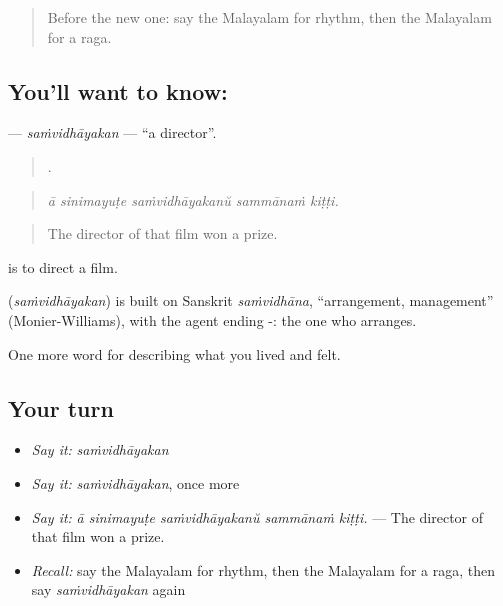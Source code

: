 \label{lesson:ML-C562-samvidhayakan}



\begin{quote}
Before the new one: say the Malayalam for rhythm, then the Malayalam for a raga.
\end{quote}

\subsection*{You'll want to know: }
\textbf{} — \emph{saṁvidhāyakan} — \textquotedblleft{}a director\textquotedblright{}.

\begin{quote}
    .
\end{quote}

\begin{quote}
\emph{ā sinimayuṭe saṁvidhāyakanŭ sammānaṁ kiṭṭi.}
\end{quote}

\begin{quote}
The director of that film won a prize.
\end{quote}

  is to direct a film.

\begin{cousinweb}
\textbf{} (\emph{saṁvidhāyakan}) is built on Sanskrit \emph{saṁvidhāna}, \textquotedblleft{}arrangement, management\textquotedblright{} (Monier-Williams), with the agent ending -: the one who arranges.
\end{cousinweb}

\begin{grammarlens}[title={What you've built}]
One more word for describing what you lived and felt.
\end{grammarlens}

\subsection*{Your turn}
\begin{itemize}
\raggedright
  \item \emph{Say it:} \emph{saṁvidhāyakan}
  \item \emph{Say it:} \emph{saṁvidhāyakan}, once more
  \item \emph{Say it:} \emph{ā sinimayuṭe saṁvidhāyakanŭ sammānaṁ kiṭṭi.} — The director of that film won a prize.
  \item \emph{Recall:} say the Malayalam for rhythm, then the Malayalam for a raga, then say \emph{saṁvidhāyakan} again
\end{itemize}

